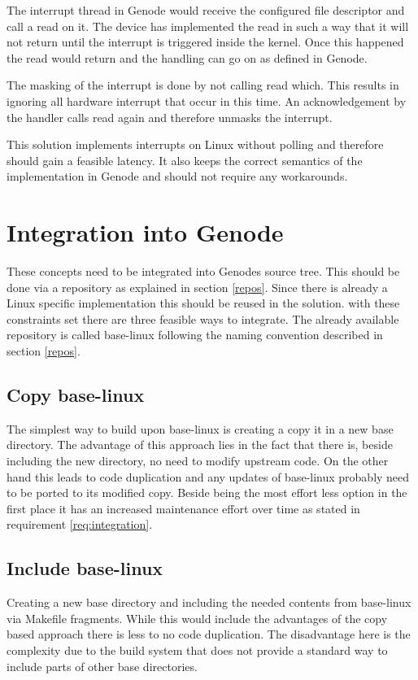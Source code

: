 \documentclass[
a4paper,
12pt,
notitlepage,
parskip=half,
DIV=11,
]{scrbook}
\begin{document}
		The interrupt thread in Genode would receive the configured file descriptor and call a read on it.
		The device has implemented the read in such a way that it will not return until the interrupt is triggered inside the kernel.
		Once this happened the read would return and the handling can go on as defined in Genode.
		
		The masking of the interrupt is done by not calling read which.
		This results in ignoring all hardware interrupt that occur in this time.
		An acknowledgement by the handler calls read again and therefore unmasks the interrupt.
		
		This solution implements interrupts on Linux without polling and therefore should gain a feasible latency.
		It also keeps the correct semantics of the implementation in Genode and should not require any workarounds.
		
		\section{Integration into Genode}
		
		These concepts need to be integrated into Genodes source tree.
		This should be done via a repository as explained in section \ref{repos}.
		Since there is already a Linux specific implementation this should be reused in the solution.
		with these constraints set there are three feasible ways to integrate.
		The already available repository is called base-linux following the naming convention described in section \ref{repos}.
		
		\subsection{Copy base-linux}
		The simplest way to build upon base-linux is creating a copy it in a new base directory.
		The advantage of this approach lies in the fact that there is, beside including the new directory, no need to modify upstream code.
		On the other hand this leads to code duplication and any updates of base-linux probably need to be ported to its modified copy.
		Beside being the most effort less option in the first place it has an increased maintenance effort over time as stated in requirement \ref{req:integration}.
		
		\subsection{Include base-linux}
		Creating a new base directory and including the needed contents from base-linux via Makefile fragments.
		While this would include the advantages of the copy based approach there is less to no code duplication.
		The disadvantage here is the complexity due to the build system that does not provide a standard way to include parts of other base directories.
		
\end{document}
